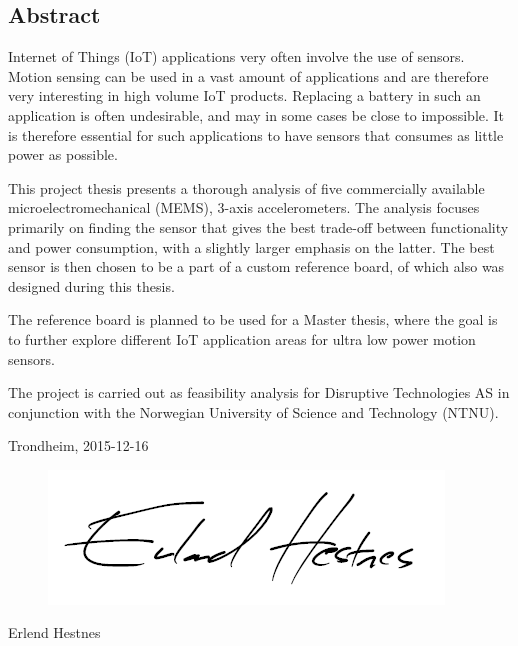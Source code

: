 \begin{center}
\section*{Abstract}
\end{center}

Internet of Things (IoT) applications very often involve the use of sensors. Motion sensing can be used in a vast amount of applications and are therefore very interesting in high volume IoT products. Replacing a battery in such an application is often undesirable, and may in some cases be close to impossible. It is therefore essential for such applications to have sensors that consumes as little power as possible. 

This project thesis presents a thorough analysis of five commercially available microelectromechanical (MEMS), 3-axis accelerometers. The analysis focuses primarily on finding the sensor that gives the best trade-off between functionality and power consumption, with a slightly larger emphasis on the latter. The best sensor is then chosen to be a part of a custom reference board, of which also was designed during this thesis.

The reference board is planned to be used for a Master thesis, where the goal is to further explore different IoT application areas for ultra low power motion sensors.

The project is carried out as feasibility analysis for Disruptive Technologies AS in conjunction with the Norwegian University of Science and Technology (NTNU).

\begin{center}
Trondheim, 2015-12-16\\[1pc]
\begin{figure}[h]
\centering
\includegraphics[scale=0.5]{fig/underskrift.png}
\label{fig:underskrift}
\end{figure}
Erlend Hestnes
\end{center}